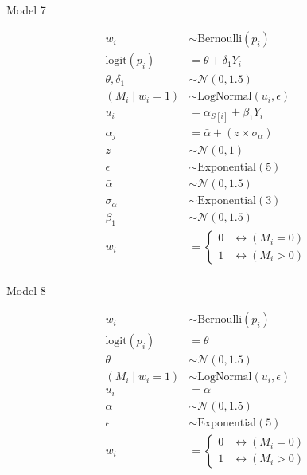 \documentclass[
  letterpaper,
  DIV=11,
  numbers=noendperiod]{scrartcl}
\makeatletter
\let\oldparagraph\paragraph
\renewcommand{\paragraph}{
    \@ifstar
      \xxxParagraphStar
      \xxxParagraphNoStar
  }
\newcommand{\xxxParagraphStar}[1]{\oldparagraph*{#1}\mbox{}}
\newcommand{\xxxParagraphNoStar}[1]{\oldparagraph{#1}\mbox{}}
\makeatother
\begin{document}
\paragraph{Model 7}\label{model-7}

\[
\begin{aligned}
w_i &\sim \mathrm{Bernoulli}(p_i) \\
\text{logit}(p_i) &= \theta + \delta_1 Y_i \\
\theta, \delta_1 &\sim \mathcal{N}(0, 1.5) \\
(M_i \mid w_i = 1) &\sim \mathrm{LogNormal}(u_i, \epsilon) \\
u_i &= \alpha_{S[i]} + \beta_1 Y_i \\
\alpha_j &= \bar{\alpha} + (z \times \sigma_\alpha) \\
z &\sim \mathcal{N}(0, 1) \\
\epsilon &\sim \mathrm{Exponential}(5) \\
\bar{\alpha} &\sim \mathcal{N}(0, 1.5) \\
\sigma_\alpha &\sim \mathrm{Exponential}(3) \\
\beta_1 &\sim \mathcal{N}(0, 1.5) \\
w_i &=
\begin{cases}
0 & \leftrightarrow (M_i = 0) \\
1 & \leftrightarrow (M_i > 0)
\end{cases}
\end{aligned}
\]

\paragraph{Model 8}\label{model-8}

\[
\begin{aligned}
w_i &\sim \mathrm{Bernoulli}(p_i) \\
\text{logit}(p_i) &= \theta \\
\theta &\sim \mathcal{N}(0, 1.5) \\
(M_i \mid w_i = 1) &\sim \mathrm{LogNormal}(u_i, \epsilon) \\
u_i &= \alpha \\
\alpha &\sim \mathcal{N}(0, 1.5) \\
\epsilon &\sim \mathrm{Exponential}(5) \\
w_i &=
\begin{cases}
0 & \leftrightarrow (M_i = 0) \\
1 & \leftrightarrow (M_i > 0)
\end{cases}
\end{aligned}
\]
\end{document}
